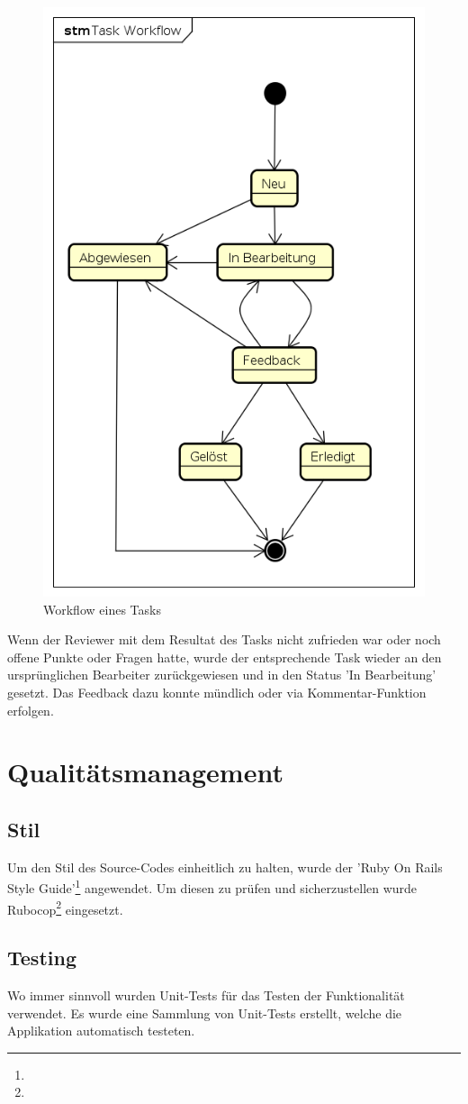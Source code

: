 \begin{figure}[H]
	\centering
	\includegraphics[width=0.5\linewidth]{fig/task_workflow}
	\caption{Workflow eines Tasks}
	\label{fig:pm:workflow}
\end{figure}

Wenn der Reviewer mit dem Resultat des Tasks nicht zufrieden war oder noch offene Punkte oder Fragen hatte, wurde der entsprechende Task wieder an den ursprünglichen Bearbeiter zurückgewiesen und in den Status 'In Bearbeitung' gesetzt. Das Feedback dazu konnte mündlich oder via Kommentar-Funktion erfolgen.

\section{Qualitätsmanagement}

\subsection*{Stil}

Um den Stil des Source-Codes einheitlich zu halten, wurde der 'Ruby On Rails Style Guide'\footnote{} angewendet. Um diesen zu prüfen und sicherzustellen wurde Rubocop\footnote{} eingesetzt.

\subsection*{Testing}

Wo immer sinnvoll wurden Unit-Tests für das Testen der Funktionalität verwendet. Es wurde eine Sammlung von Unit-Tests erstellt, welche die Applikation automatisch testeten.

